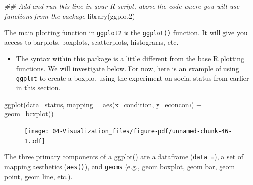 \documentclass[
  letterpaper,
  DIV=11,
  numbers=noendperiod]{scrreprt}
\newenvironment{Shaded}{\begin{snugshade}}{\end{snugshade}}
\newcommand{\AttributeTok}[1]{\textcolor[rgb]{0.40,0.45,0.13}{#1}}
\newcommand{\DocumentationTok}[1]{\textcolor[rgb]{0.37,0.37,0.37}{\textit{#1}}}
\newcommand{\FunctionTok}[1]{\textcolor[rgb]{0.28,0.35,0.67}{#1}}
\newcommand{\NormalTok}[1]{\textcolor[rgb]{0.00,0.23,0.31}{#1}}
\newcommand{\SpecialCharTok}[1]{\textcolor[rgb]{0.37,0.37,0.37}{#1}}
\providecommand{\tightlist}{%
  \setlength{\itemsep}{0pt}\setlength{\parskip}{0pt}}\usepackage{longtable,booktabs,array}
\begin{document}
\begin{Shaded}
\begin{Highlighting}[]
\DocumentationTok{\#\# Add and run this line in your R script, above the code where you will use functions from the package}
\FunctionTok{library}\NormalTok{(ggplot2)}
\end{Highlighting}
\end{Shaded}

The main plotting function in \texttt{ggplot2} is the \texttt{ggplot()}
function. It will give you access to barplots, boxplots, scatterplots,
histograms, etc.

\begin{itemize}
\tightlist
\item
  The syntax within this package is a little different from the base R
  plotting functions. We will investigate below. For now, here is an
  example of using \texttt{ggplot} to create a boxplot using the
  experiment on social status from earlier in this section.
\end{itemize}

\begin{Shaded}
\begin{Highlighting}[]
\FunctionTok{ggplot}\NormalTok{(}\AttributeTok{data=}\NormalTok{status, }\AttributeTok{mapping =} \FunctionTok{aes}\NormalTok{(}\AttributeTok{x=}\NormalTok{condition, }\AttributeTok{y=}\NormalTok{econcon)) }\SpecialCharTok{+}
  \FunctionTok{geom\_boxplot}\NormalTok{()}
\end{Highlighting}
\end{Shaded}

\begin{figure}[H]

{\centering \texttt{[image: 04-Visualization\_files/figure-pdf/unnamed-chunk-46-1.pdf]}

}

\end{figure}

The three primary components of a ggplot() are a dataframe
(\texttt{data\ =}), a set of mapping aesthetics (\texttt{aes()}), and
\texttt{geoms} (e.g., geom boxplot, geom bar, geom point, geom line,
etc.).
\end{document}
